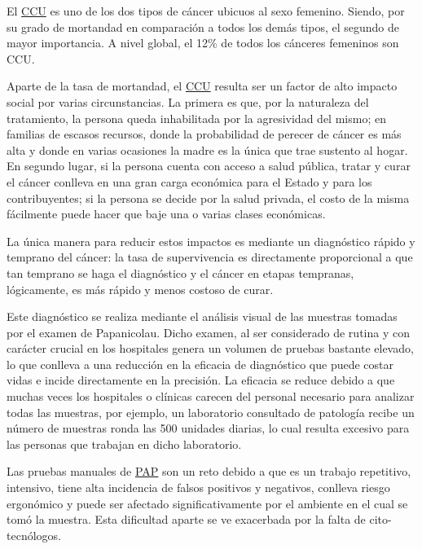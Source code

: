 El \hyperlink{abbr}{CCU} es uno de los dos tipos de cáncer ubicuos al sexo
femenino. Siendo, por su grado de mortandad en comparación a todos los demás
tipos, el segundo de mayor importancia. A nivel global,  el 12\% de todos los
cánceres femeninos son
CCU.~\cite{CancerToday-InstitutionalAgencyforResearchonCancerWHO2018}

Aparte de la tasa de mortandad, el \hyperlink{abbr}{CCU} resulta ser un factor
de alto impacto social por varias circunstancias. La primera es que, por la
naturaleza del tratamiento, la persona queda inhabilitada por la agresividad del
mismo; en familias de escasos recursos, donde la probabilidad de perecer de
cáncer es más alta y donde en varias ocasiones la madre es la única que trae
sustento al hogar. En segundo lugar, si la persona cuenta con acceso a salud
pública, tratar y curar el cáncer conlleva en una gran carga económica para el
Estado y para los contribuyentes; si la persona se decide por la salud privada,
el costo de la misma fácilmente puede hacer que baje una o varias clases
económicas.~\cite{SecretariadeSalud2015a}

La única manera para reducir estos impactos es mediante un diagnóstico rápido y
temprano del cáncer: la tasa de supervivencia es directamente proporcional a que
tan temprano se haga el diagnóstico y el cáncer en etapas tempranas,
lógicamente, es más rápido y menos costoso de curar.~\cite{WorldHealthOrganization}

Este diagnóstico se realiza mediante el análisis visual de las muestras tomadas
por el examen de Papanicolau. Dicho examen, al ser considerado de rutina y con
carácter crucial en los hospitales genera un volumen de pruebas bastante
elevado, lo que conlleva a una reducción en la eficacia de diagnóstico que puede
costar vidas e incide directamente en la precisión. La eficacia se reduce debido
a que muchas veces los hospitales o clínicas carecen del personal necesario para
analizar todas las muestras, por ejemplo, un laboratorio consultado de patología
recibe un número de muestras ronda las 500 unidades diarias, lo cual resulta
excesivo para las personas que trabajan en dicho
laboratorio.~\cite{DelMoral2017} 

Las pruebas manuales de \hyperlink{abbr}{PAP} son un reto debido a que es un
trabajo repetitivo, intensivo, tiene alta incidencia de falsos positivos y
negativos, conlleva riesgo ergonómico y puede ser afectado significativamente
por el ambiente en el cual se tomó la muestra. Esta dificultad aparte se ve
exacerbada por la falta de cito-tecnólogos.~\cite{Cucoranu2014}

